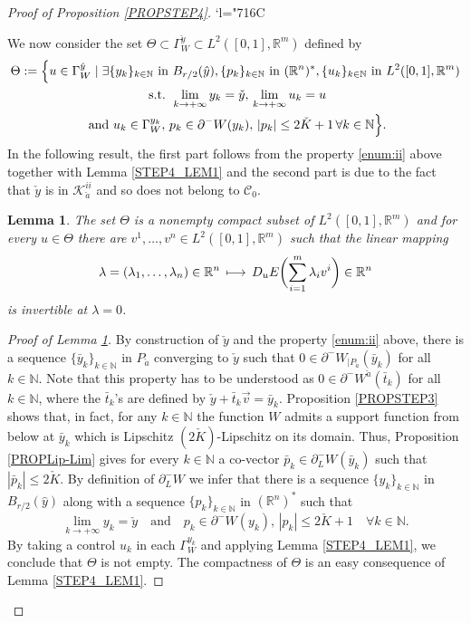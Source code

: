 \documentclass[JEP,XML,SOM,Unicode,NoFloatCountersInSection,published]{cedram}
\newcommand{\Changelback}{\mathcode`l="716C}
\newcommand\mto{\mathchoice{\longmapsto}{\mapsto}{\mapsto}{\mapsto}}
\let\sep\mid
\newcommand\R{\mathbb R}
\newcommand\N{\mathbb N}
\newtheorem{lemma}[theorem]{Lemma}
\theoremstyle{definition}
\begin{document}
\begin{proof}[Proof of Proposition \ref{PROPSTEP4}]
\Changelback

We now consider the set $\Theta \subset \Gamma_W^{\check{y}} \subset L^2([0,1],\R^m)$ defined by
\begin{multline*}
\Theta := \Bigl\{ u \in \Gamma_W^{\check{y}}\sep  \exists \{y_k\}_{k\in \N} \text{ in } B_{r/2}(\hat{y}), \{p_k\}_{k\in \N} \text{ in } (\R^n)^*, \{u_k\}_{k\in \N} \text{ in } L^2([0,1],\R^m) \\
\text{ s.t. } \lim_{k\to +\infty}y_k = \check{y}, \, \lim_{k\to +\infty}u_k = u\\
\text{ and } u_k\in \Gamma_W^{y_k}, \, p_k \in \partial^- W(y_k), \, |p_k|\leq 2\check{K}+1 \, \forall k \in \N\Bigr\}.
\end{multline*}
In the following result, the first part follows from the property \eqref{enum:ii} above together with Lemma \ref{STEP4_LEM1} and the second part is due to the fact that $\check{y}$ is in $\mathcal{K}_{\check{a}}^{ii}$ and so does not belong to $\mathcal{C}_0$.

\begin{lemma}\label{STEP4_LEM2}
The set $\Theta$ is a nonempty compact subset of $L^2([0,1],\R^m)$ and for every $u\in \Theta$ there are $v^1, \ldots, v^n \in L^2([0,1],\R^m)$ such that the linear mapping
\[
\lambda =(\lambda_1, \ldots, \lambda_n) \in \R^n \, \mto \, D_uE \biggl(\sum_{i=1}^m \lambda_i v^{i}\biggr) \in \R^n
\]
is invertible at $\lambda=0$.
\end{lemma}
\begin{proof}[Proof of Lemma \ref{STEP4_LEM2}]
By construction of $\check{y}$ and the property \eqref{enum:ii} above, there is a sequence $\{\bar{y}_k\}_{k\in \N}$ in $P_{\check{a}}$ converging to $\check{y}$ such that $0\in \partial^-W_{|P_{\check{a}}}(\bar{y}_k)$ for all $k\in \N$. Note that this property has to be understood as $0\in \partial^-W^{\check{a}}(\bar{t}_k)$ for all $k\in \N$, where the $\bar{t}_k$'s are defined by $\check{y}+\bar{t}_k\vec{v}=\bar{y}_k$. Proposition \ref{PROPSTEP3} shows that, in fact, for any $k\in \N$ the function $W$ admits a support function from below at $\bar{y}_k$ which is Lipschitz $(2\check{K})$-Lipschitz on its domain. Thus, Proposition \ref{PROPLip-Lim} gives for every $k\in \N$ a co-vector $\bar{p}_k\in \partial^-_LW(\bar{y}_k)$ such that $|\bar{p}_k| \leq 2\check{K}$. By definition of $\partial^-_LW$ we infer that there is a sequence $\{y_k\}_{k\in \N}$ in $B_{r/2}(\hat{y})$ along with a sequence $\{p_k\}_{k\in \N}$ in $(\R^n)^*$ such that
\[
\lim_{k\to +\infty}y_k = \check{y} \quad \text{and} \quad p_k \in \partial^- W(y_k), \, |p_k|\leq 2\check{K}+1 \quad \forall k \in \N.
\]
By taking a control $u_k$ in each $\Gamma_W^{y_k}$ and applying Lemma \ref{STEP4_LEM1}, we conclude that $\Theta$ is not empty. The compactness of $\Theta$ is an easy consequence of Lemma \ref{STEP4_LEM1}.


\end{proof}
\end{proof}
\end{document}
